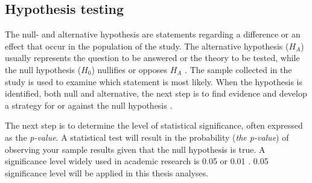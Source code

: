 


\subsection{Hypothesis testing}\label{sec:hypothesistesting}
The null- and alternative hypothesis are statements regarding a difference or an effect that occur in the population of the study. The alternative hypothesis ($H_A$) usually represents the question to be answered or the theory to be tested, while the null hypothesis ($H_{0}$) nullifies or opposes $H_A$ \citep{Walpole2012}. The sample collected in the study is used to examine which statement is most likely. When the hypothesis is identified, both null and alternative, the next step is to find evidence and develop a strategy for or against the null hypothesis \citep{LundResearchLtd2013}.

The next step is to determine the level of statistical significance, often expressed as the \textit{p-value}. A statistical test will result in the probability (\textit{the p-value}) of observing your sample results given that the null hypothesis is true. A significance level widely used in academic research is 0.05 or 0.01 \citep{Walpole2012}. 0.05 significance level will be applied in this thesis analyses.

